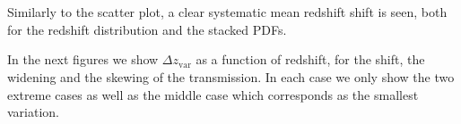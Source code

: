\documentclass[11pt]{article}
\begin{document}
    \begin{center}
    \end{center}
    { \hspace*{\fill} \\}
    
    \begin{center}
    \end{center}
    { \hspace*{\fill} \\}
    
    Similarly to the scatter plot, a clear systematic mean redshift shift is
seen, both for the redshift distribution and the stacked PDFs.

In the next figures we show \(\Delta z_\mathrm{var}\) as a function of
redshift, for the shift, the widening and the skewing of the
transmission. In each case we only show the two extreme cases as well as
the middle case which corresponds as the smallest variation.
\end{document}
